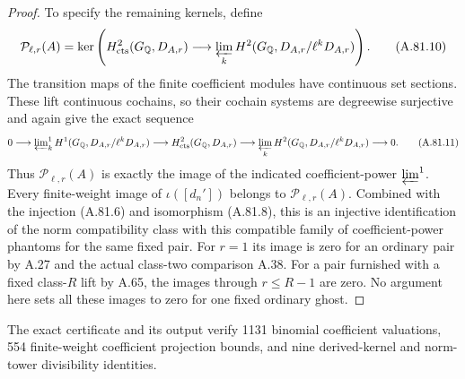 \begin{proof}
To specify the remaining kernels, define
\[
 \mathcal P_{\ell,r}(A)=
 \ker\left(
 H^2_{\rm cts}(G_\mathbb Q,D_{A,r})\longrightarrow
 \varprojlim_k
 H^2(G_\mathbb Q,D_{A,r}/\ell^kD_{A,r})
 \right).
 \tag{A.81.10}
\]
The transition maps of the finite coefficient
modules have continuous set sections.  These
lift continuous cochains, so their cochain
systems are degreewise surjective and again give
the exact sequence
\[
 0\longrightarrow
 \varprojlim\nolimits_k^1
 H^1(G_\mathbb Q,D_{A,r}/\ell^kD_{A,r})
 \longrightarrow H^2_{\rm cts}(G_\mathbb Q,D_{A,r})
 \longrightarrow
 \varprojlim_kH^2(G_\mathbb Q,D_{A,r}/\ell^kD_{A,r})
 \longrightarrow0 .
 \tag{A.81.11}
\]
Thus $\mathcal P_{\ell,r}(A)$ is exactly the image
of the indicated coefficient-power $\varprojlim^1$.
Every finite-weight image of $\iota([d_n'])$
belongs to $\mathcal P_{\ell,r}(A)$.
Combined with the injection (A.81.6) and
isomorphism (A.81.8), this is an injective
identification of the norm compatibility class
with this compatible family of coefficient-power
phantoms for the same fixed pair.
For $r=1$ its image is zero for an ordinary pair
by A.27 and the actual class-two comparison A.38.
For a pair furnished with a fixed class-$R$ lift
by A.65, the images through $r\leq R-1$ are zero.
No argument here sets all these images to zero
for one fixed ordinary ghost.
\end{proof}

The exact certificate
 and its output
verify 1131 binomial coefficient valuations, 554
finite-weight coefficient projection bounds, and nine
derived-kernel and norm-tower divisibility identities.

